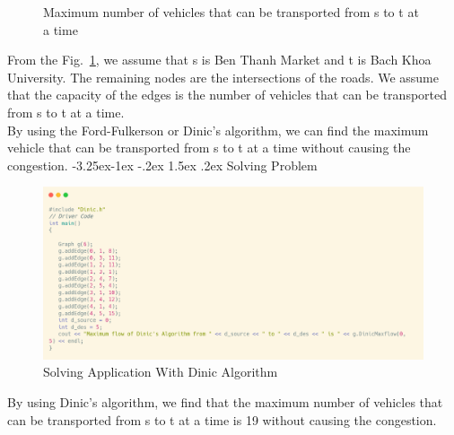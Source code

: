 \documentclass[a4paper]{article}
\makeatletter
\newcounter {subsubsubsection}[subsubsection]
\newcommand\subsubsubsection{\@startsection{subsubsubsection}{4}{\z@}%
                                     {-3.25ex\@plus -1ex \@minus -.2ex}%
                                     {1.5ex \@plus .2ex}%
                                     {\normalfont\normalsize\bfseries}}
\makeatother
\begin{document}
\begin{figure}[H]\centering
{}
 \caption{Maximum number of vehicles that can be transported from s to t at a time}
 \label{fig:q2app}
\end{figure}
From the Fig.~\ref{fig:q2app}, we assume that s is Ben Thanh Market and t is Bach Khoa University. The remaining nodes are the intersections of the roads. We assume that the capacity of the edges is the number of vehicles that can be transported from s to t at a time. \\
By using the Ford-Fulkerson or Dinic's algorithm, we can find the maximum vehicle that can be transported from s to t at a time without causing the congestion.
\subsubsubsection{Solving Problem}
\begin{figure}[H]\centering
	\includegraphics[width=\linewidth ]{application.png}
	\caption{Solving Application With Dinic Algorithm}
	\label{fig:q2d}
\end{figure}
By using Dinic's algorithm, we find that the maximum number of vehicles that can be transported from s to t at a time is 19 without causing the congestion.
\end{document}
